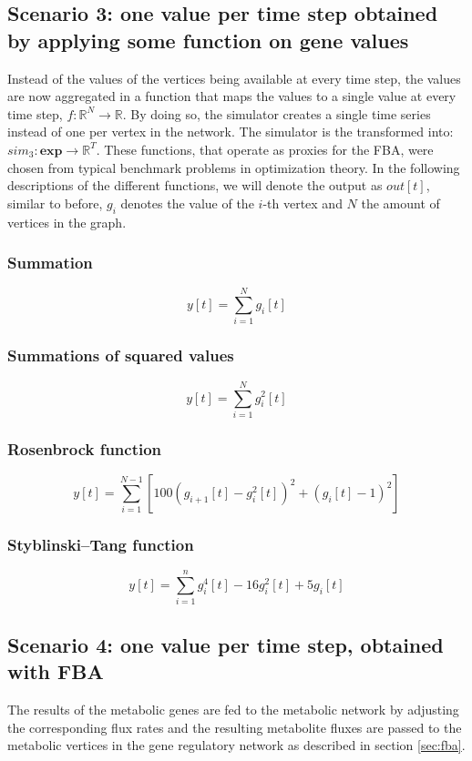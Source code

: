 \subsection{Scenario 3: one value per time step obtained by applying some function on gene values}
Instead of the values of the vertices being available at every time step, the values are now aggregated in a function that maps the values to a single value at every time step, $f: \mathbb{R}^{N} \to \mathbb{R}$.
By doing so, the simulator creates a single time series instead of one per vertex in the network. The simulator is the transformed into: $sim_{3}: \mathbf{exp} \to \mathbb{R}^{T}$. 
These functions, that operate as proxies for the FBA, were chosen from typical benchmark problems in optimization theory. In the following descriptions of the different functions, we will denote the output as
$out[t]$, similar to before, $g_i$ denotes the value of the $i$-th vertex and $N$ the amount of vertices in the graph.
\subsubsection{Summation}
\begin{equation}
 y[t] = \sum_{i=1}^N g_i[t]
\end{equation}
\subsubsection{Summations of squared values}
\begin{equation}
 y[t] = \sum_{i=1}^N g_i^2[t]
\end{equation}
\subsubsection{Rosenbrock function}
\begin{equation}
 y[t] = \sum_{i=1}^{N-1}[100(g_{i+1}[t] - g_i^2[t])^2 + (g_i[t] - 1 )^2]
\end{equation}
\subsubsection{Styblinski–Tang function}
\begin{equation}
 y[t] = \sum_{i=1}^n g_i^4[t] - 16g_i^2[t] + 5g_i[t]
\end{equation}
\subsection{Scenario 4: one value per time step, obtained with FBA}
The results of the metabolic genes are fed to the metabolic network by adjusting the corresponding flux rates and the resulting metabolite fluxes are passed to the metabolic vertices in the gene regulatory network
as described in section \ref{sec:fba}.
